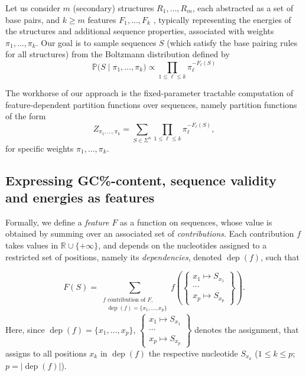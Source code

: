\documentclass[]{bmcart}
\newcommand{\dep}{\operatorname{dep}}
\newcommand{\partfun}[1]{Z_{#1}}
\newcommand{\Def}[1]{\emph{#1}}
\newcommand{\Nuc}[1]{{\sf #1}}
\newcommand{\Cb}{\Nuc{C}}
\newcommand{\Gb}{\Nuc{G}}
\newcommand{\GCb}{\Gb\Cb}
\renewcommand{\Pr}[1]{\mathbb{P}{#1}}
\newcommand{\revised}[1]{{\color{red} #1}}
\begin{document}
Let us consider $m$ (secondary) structures $R_1,\dots, R_m$, each abstracted as a set of base pairs, and \revised{$k\geq m$} features $F_1,\dots, F_k$\revised{, typically representing the energies of the structures and additional sequence properties,} associated with weights $\pi_1,\dots,\pi_k$. Our goal is to sample sequences \revised{$S$ (which satisfy the base pairing rules for all structures) from the Boltzmann distribution defined by} 
\begin{equation}
\label{eq:sample-distribution}
\Pr(S\mid\pi_1,\dots,\pi_k) \propto \displaystyle\prod_{1\leq \ell\leq k}\!\! \pi_\ell^{-F_\ell(S)} \end{equation}


The workhorse of our approach is the \revised{fixed-parameter tractable} computation of feature-dependent partition functions over sequences, \revised{namely partition functions of the form} 
%
  \begin{equation}
    \label{eq:mainproblem}
    \partfun{\pi_1,\dots,\pi_k} = \sum_{S\in\Sigma^n} \prod_{1\leq \ell\leq k} \pi_\ell^{-F_\ell(S)},
  \end{equation}
  for specific weights $\pi_1,\dots,\pi_k$.

\subsection*{Expressing \GCb\%-content, sequence validity and energies as features}
Formally, we define a \Def{feature $F$} as a function on sequences, whose value is obtained by summing over an associated set of \Def{contributions}. Each contribution $f$ takes values in $\mathbb{R}\cup \{+\infty\}$, and depends on the nucleotides assigned to a restricted set of positions, \revised{namely its \emph{dependencies}, denoted $\dep(f)$}, such that

$$
F(S) =\!\!\!\!\!\!\!\sum_{\substack{\text{$f$ contribution of $F$,}\\\text{ $\dep(f)=\{x_1,\ldots,x_p\}$}}}\!\!\!\!\!\! f\left(\left\{\substack{x_1\mapsto S_{x_1}\\\cdots\\x_p\mapsto S_{x_p}}\right\}\right).
$$
\revised{Here, since $\dep(f)=\{x_1,\ldots,x_p\}$, $\left\{\substack{x_1\mapsto S_{x_1}\\\cdots\\x_p\mapsto S_{x_p}}\right\}$ denotes the assignment, that assigns to all positions $x_k$  in $\dep(f)$ the respective nucleotide $S_{x_k}$ ($1\leq k\leq p$; $p=|\dep(f)|$).} 
\end{document}
